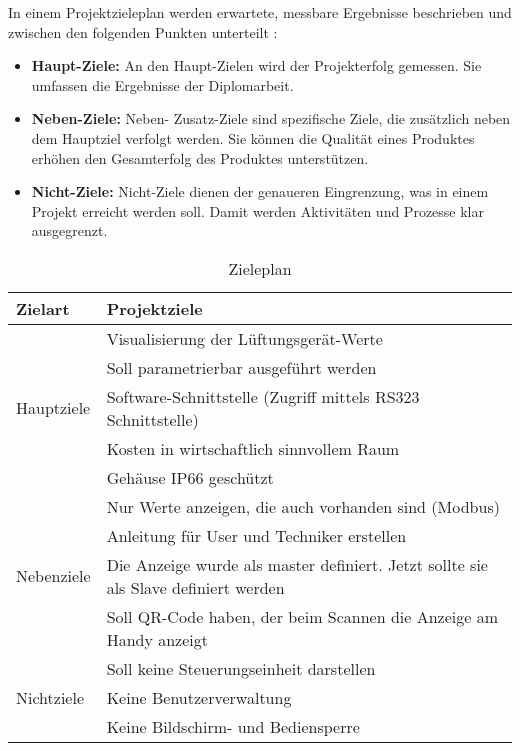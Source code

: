 In einem Projektzieleplan werden erwartete, messbare Ergebnisse beschrieben und zwischen den folgenden Punkten unterteilt \cite{Diplomarbeiten-bbs:o.J.}:
\begin{itemize}
	\item \textbf{Haupt-Ziele:} An den Haupt-Zielen wird der  Projekterfolg gemessen. Sie umfassen die Ergebnisse der Diplomarbeit.
	\item \textbf{Neben-Ziele:} Neben- \bzw Zusatz-Ziele sind spezifische Ziele, die zusätzlich neben dem Hauptziel verfolgt werden. Sie können die Qualität eines Produktes erhöhen \bzw den Gesamterfolg des Produktes unterstützen.
	\item \textbf{Nicht-Ziele:} Nicht-Ziele dienen der genaueren Eingrenzung, was in einem Projekt erreicht werden soll. Damit werden Aktivitäten und Prozesse klar ausgegrenzt.
\end{itemize}

\begin{table}[htpb]
	\caption{Zieleplan}
	\label{tab:ziele_plan}
	\begin{tabular}{p{} | p{}}
		\toprule
		\textbf{Zielart} & \textbf{Projektziele} \\
		\midrule
		& Visualisierung der Lüftungsgerät-Werte
		\\
		& Soll parametrierbar ausgeführt werden
		\\
		Hauptziele & Software-Schnittstelle (Zugriff mittels RS323 Schnittstelle)
		\\
		& Kosten in wirtschaftlich sinnvollem Raum
		\\
		& Gehäuse IP66 geschützt 
		\\
		\midrule
		& Nur Werte anzeigen, die auch vorhanden sind (Modbus)
		\\
		& Anleitung für User und Techniker erstellen
		\\
		Nebenziele & Die Anzeige wurde als master definiert. Jetzt sollte sie als Slave definiert werden
		\\
		& Soll QR-Code haben, der beim Scannen die Anzeige am Handy anzeigt
		\\
		\midrule
		& Soll keine Steuerungseinheit darstellen
		\\
		Nichtziele & Keine Benutzerverwaltung
		\\
		& Keine Bildschirm- und Bediensperre
		\\
		\bottomrule
	\end{tabular}
\end{table}